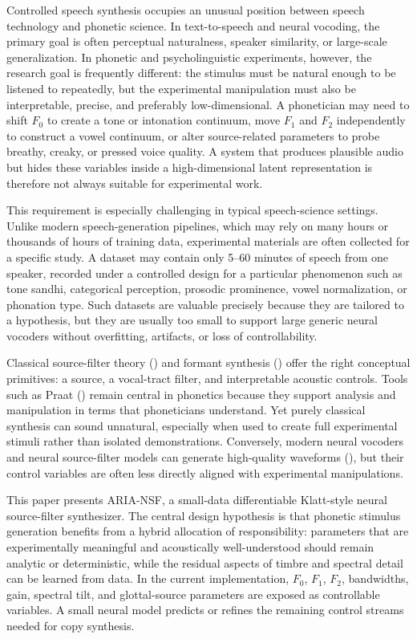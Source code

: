 \documentclass[
  10pt,
]{article}
\begin{document}
Controlled speech synthesis occupies an unusual position between speech
technology and phonetic science. In text-to-speech and neural vocoding,
the primary goal is often perceptual naturalness, speaker similarity, or
large-scale generalization. In phonetic and psycholinguistic
experiments, however, the research goal is frequently different: the
stimulus must be natural enough to be listened to repeatedly, but the
experimental manipulation must also be interpretable, precise, and
preferably low-dimensional. A phonetician may need to shift \(F_0\) to
create a tone or intonation continuum, move \(F_1\) and \(F_2\)
independently to construct a vowel continuum, or alter source-related
parameters to probe breathy, creaky, or pressed voice quality. A system
that produces plausible audio but hides these variables inside a
high-dimensional latent representation is therefore not always suitable
for experimental work.

This requirement is especially challenging in typical speech-science
settings. Unlike modern speech-generation pipelines, which may rely on
many hours or thousands of hours of training data, experimental
materials are often collected for a specific study. A dataset may
contain only 5--60 minutes of speech from one speaker, recorded under a
controlled design for a particular phenomenon such as tone sandhi,
categorical perception, prosodic prominence, vowel normalization, or
phonation type. Such datasets are valuable precisely because they are
tailored to a hypothesis, but they are usually too small to support
large generic neural vocoders without overfitting, artifacts, or loss of
controllability.

Classical source-filter theory () and formant synthesis () offer the right conceptual primitives: a source, a vocal-tract
filter, and interpretable acoustic controls. Tools such as Praat
() remain central in
phonetics because they support analysis and manipulation in terms that
phoneticians understand. Yet purely classical synthesis can sound
unnatural, especially when used to create full experimental stimuli
rather than isolated demonstrations. Conversely, modern neural vocoders
and neural source-filter models can generate high-quality waveforms
(), but their control
variables are often less directly aligned with experimental
manipulations.

This paper presents ARIA-NSF, a small-data differentiable Klatt-style
neural source-filter synthesizer. The central design hypothesis is that
phonetic stimulus generation benefits from a hybrid allocation of
responsibility: parameters that are experimentally meaningful and
acoustically well-understood should remain analytic or deterministic,
while the residual aspects of timbre and spectral detail can be learned
from data. In the current implementation, \(F_0\), \(F_1\), \(F_2\),
bandwidths, gain, spectral tilt, and glottal-source parameters are
exposed as controllable variables. A small neural model predicts or
refines the remaining control streams needed for copy synthesis.
\end{document}
